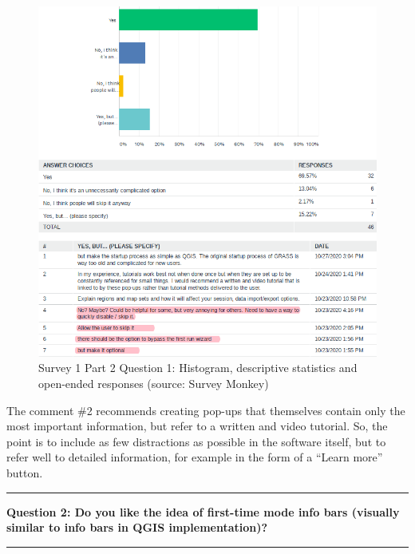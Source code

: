 \documentclass[a4paper,10pt,twoside]{article}
\begin{document}
\vspace{0.3cm}
\begin{figure}[hbt!] 
\begin{center}
\includegraphics[width=15cm]{../surveys/analyzed_data/survey1_part2_question1_all.png} 
\caption[Survey 1 Part 2 Question 1: Histogram, descriptive statistics and open-ended responses]{Survey 1 Part 2 Question 1: Histogram, descriptive statistics and open-ended responses (source:  Survey Monkey)}
\label{fig:survey1_part2_question1_all}
\end{center}
\end{figure}

\noindent The comment \#2 recommends creating pop-ups that themselves contain only the most important information, but refer to a written and video tutorial. So, the point is to include as few distractions as possible in the software itself, but to refer well to detailed information, for example in the form of a ``Learn more'' button.

\par\noindent\rule{\textwidth}{0.4pt}
\noindent \textbf{Question 2: Do you like the idea of first-time mode info bars (visually similar to info bars in QGIS implementation)?}
\par\noindent\rule{\textwidth}{0.4pt}
\end{document}

